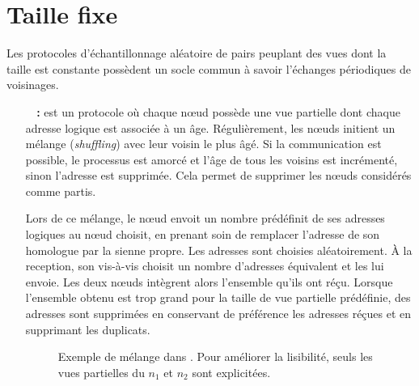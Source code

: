 

\section{Taille fixe}
\label{net:sec:fixed}

Les protocoles d'échantillonnage aléatoire de pairs peuplant des vues dont la
taille est constante possèdent un socle commun à savoir l'échanges périodiques
de voisinages.

\begin{itemize}
\item [\textbf{\CYCLON~\cite{voulgaris2005cyclon} :}] est un protocole où chaque
  nœud possède une vue partielle dont chaque adresse logique est associée à un
  âge. Régulièrement, les nœuds initient un mélange (\emph{shuffling}) avec leur
  voisin le plus âgé. Si la communication est possible, le processus est amorcé
  et l'âge de tous les voisins est incrémenté, sinon l'adresse est
  supprimée. Cela permet de supprimer les nœuds considérés comme partis.

  Lors de ce mélange, le nœud envoit un nombre prédéfinit de ses adresses
  logiques au nœud choisit, en prenant soin de remplacer l'adresse de son
  homologue par la sienne propre. Les adresses sont choisies aléatoirement. À la
  reception, son vis-à-vis choisit un nombre d'adresses équivalent et les lui
  envoie. Les deux nœuds intègrent alors l'ensemble qu'ils ont réçu. Lorsque
  l'ensemble obtenu est trop grand pour la taille de vue partielle prédéfinie,
  des adresses sont supprimées en conservant de préférence les adresses réçues
  et en supprimant les duplicats.
  
  \begin{figure}
    \centering
    \hspace{35pt}
    \caption{\label{net:fig:cyclonexample} Exemple de mélange dans \CYCLON. Pour
      améliorer la lisibilité, seuls les vues partielles du $n_1$ et $n_2$ sont
      explicitées.}
  \end{figure}
  

\end{itemize}
